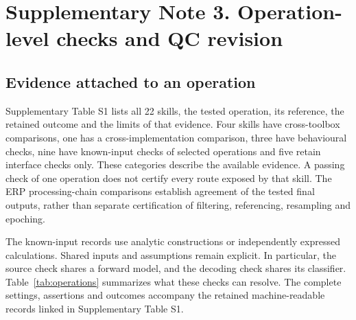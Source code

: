 \section*{Supplementary Note 3. Operation-level checks and QC revision}

\subsection*{Evidence attached to an operation}
Supplementary Table S1 lists all 22 skills, the tested operation, its reference, the retained outcome and the limits of that evidence. Four skills have cross-toolbox comparisons, one has a cross-implementation comparison, three have behavioural checks, nine have known-input checks of selected operations and five retain interface checks only. These categories describe the available evidence. A passing check of one operation does not certify every route exposed by that skill. The ERP processing-chain comparisons establish agreement of the tested final outputs, rather than separate certification of filtering, referencing, resampling and epoching.

The known-input records use analytic constructions or independently expressed calculations. Shared inputs and assumptions remain explicit. In particular, the source check shares a forward model, and the decoding check shares its classifier. Table~\ref{tab:operations} summarizes what these checks can resolve. The complete settings, assertions and outcomes accompany the retained machine-readable records linked in Supplementary Table S1.

